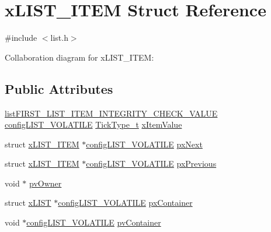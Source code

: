 \hypertarget{structx_l_i_s_t___i_t_e_m}{}\section{x\+L\+I\+S\+T\+\_\+\+I\+T\+EM Struct Reference}
\label{structx_l_i_s_t___i_t_e_m}


{\ttfamily \#include $<$list.\+h$>$}



Collaboration diagram for x\+L\+I\+S\+T\+\_\+\+I\+T\+EM\+:
\subsection*{Public Attributes}
\begin{DoxyCompactItemize}
\item 
\hyperlink{vendor_2ceedling_2plugins_2freertos_2vendor_2freertos_2include_2list_8h_a3611bd5d5d87cb26ac1dc7a4852b94a0}{list\+F\+I\+R\+S\+T\+\_\+\+L\+I\+S\+T\+\_\+\+I\+T\+E\+M\+\_\+\+I\+N\+T\+E\+G\+R\+I\+T\+Y\+\_\+\+C\+H\+E\+C\+K\+\_\+\+V\+A\+L\+UE} \hyperlink{vendor_2ceedling_2plugins_2freertos_2vendor_2freertos_2include_2list_8h_a2d5de557c5561c8980d1bf51d87d8cba}{config\+L\+I\+S\+T\+\_\+\+V\+O\+L\+A\+T\+I\+LE} \hyperlink{externals_2freertos_2portable_2_g_c_c_2_a_r_m___c_m0_2portmacro_8h_aa69c48c6e902ce54f70886e6573c92a9}{Tick\+Type\+\_\+t} \hyperlink{structx_l_i_s_t___i_t_e_m_a9b1f26de79f9da1403ca3ebc7a2e653a}{x\+Item\+Value}
\item 
struct \hyperlink{structx_l_i_s_t___i_t_e_m}{x\+L\+I\+S\+T\+\_\+\+I\+T\+EM} $\ast$\hyperlink{vendor_2ceedling_2plugins_2freertos_2vendor_2freertos_2include_2list_8h_a2d5de557c5561c8980d1bf51d87d8cba}{config\+L\+I\+S\+T\+\_\+\+V\+O\+L\+A\+T\+I\+LE} \hyperlink{structx_l_i_s_t___i_t_e_m_a9d3b501f7bb59030b137fe98b8e925e0}{px\+Next}
\item 
struct \hyperlink{structx_l_i_s_t___i_t_e_m}{x\+L\+I\+S\+T\+\_\+\+I\+T\+EM} $\ast$\hyperlink{vendor_2ceedling_2plugins_2freertos_2vendor_2freertos_2include_2list_8h_a2d5de557c5561c8980d1bf51d87d8cba}{config\+L\+I\+S\+T\+\_\+\+V\+O\+L\+A\+T\+I\+LE} \hyperlink{structx_l_i_s_t___i_t_e_m_a28edb348dac62ec9f84df7ffc2ef8d81}{px\+Previous}
\item 
void $\ast$ \hyperlink{structx_l_i_s_t___i_t_e_m_ae639b0b2b1b9da88a3751b2a28251762}{pv\+Owner}
\item 
struct \hyperlink{structx_l_i_s_t}{x\+L\+I\+ST} $\ast$\hyperlink{vendor_2ceedling_2plugins_2freertos_2vendor_2freertos_2include_2list_8h_a2d5de557c5561c8980d1bf51d87d8cba}{config\+L\+I\+S\+T\+\_\+\+V\+O\+L\+A\+T\+I\+LE} \hyperlink{structx_l_i_s_t___i_t_e_m_afb1e27a88f6b064cd0216de08009844a}{px\+Container}
\item 
void $\ast$\hyperlink{vendor_2ceedling_2plugins_2freertos_2vendor_2freertos_2include_2list_8h_a2d5de557c5561c8980d1bf51d87d8cba}{config\+L\+I\+S\+T\+\_\+\+V\+O\+L\+A\+T\+I\+LE} \hyperlink{structx_l_i_s_t___i_t_e_m_a23ad5577574efa6ff7bb29825691298c}{pv\+Container}
\end{DoxyCompactItemize}


